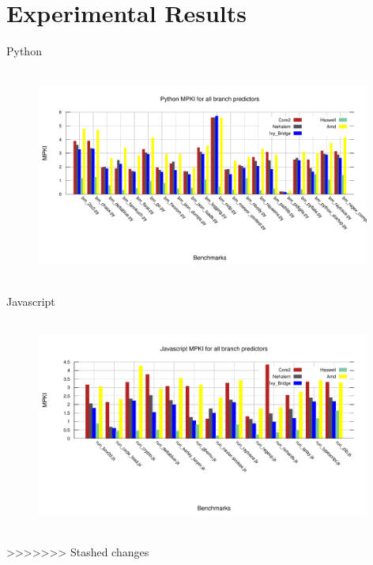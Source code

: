 \documentclass[10pt]{beamer}
\begin{document}
\section{Experimental Results}
\begin{frame}{Python}
    \begin{figure}[t]
        \centering
        \includegraphics[width=11cm, height=7cm]{figures/python_MPKI.pdf}
    \end{figure}
\end{frame}

\begin{frame}{Javascript}
    \begin{figure}[t]
        \centering
        \includegraphics[width=11cm, height=7cm]{figures/javascript_MPKI.pdf}
    \end{figure}
\end{frame}
>>>>>>> Stashed changes
\end{document}
